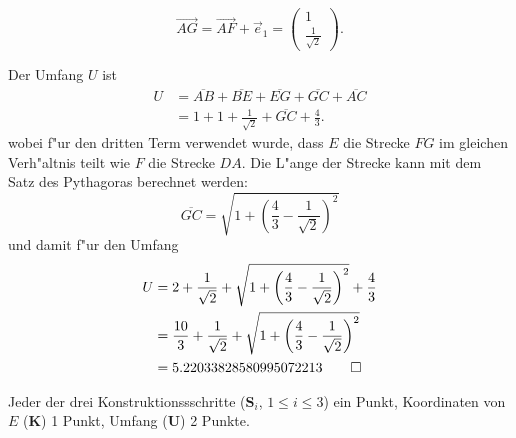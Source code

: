 \begin{loesung}
\begin{teilaufgaben}
\begin{enumerate}
\[
\overrightarrow{AG}
=
\overrightarrow{AF}+\vec{e}_1
=
\begin{pmatrix}1\\\frac1{\sqrt{2}}\end{pmatrix}.
\]
\end{enumerate}
\item
Der Umfang $U$ ist
\begin{align*}
U
&=
\overline{AB} + \overline{BE} + \overline{EG} + \overline{GC} +\overline{AC}
\\
&=
1 + 1 + \frac1{\sqrt{2}}+\overline{GC} + \frac43.
\end{align*}
wobei f"ur den dritten Term verwendet wurde, dass $E$ die Strecke
$FG$ im gleichen Verh"altnis teilt wie $F$ die Strecke $DA$.
Die L"ange der Strecke kann mit dem Satz des Pythagoras berechnet
werden:
\[
\overline{GC}
=
\sqrt{1+\left(\frac43-\frac1{\sqrt{2}}\right)^2}
\]
und damit f"ur den Umfang
\begin{align*}
U
&=
 2
+ \frac1{\sqrt{2}}
+ \sqrt{1+\left(\frac43-\frac1{\sqrt{2}}\right)^2}
+ \frac43
\\
&=
\frac{10}{3}
+ \frac1{\sqrt{2}}
+ \sqrt{1+\left(\frac43-\frac1{\sqrt{2}}\right)^2}
\\
&=
5.22033828580995072213
\qedhere
\end{align*}
\end{teilaufgaben}
\end{loesung}

\begin{bewertung}
Jeder der drei Konstruktionssschritte ($\textbf{S}_i$, $1\le i\le 3$) ein Punkt,
Koordinaten von $E$ ({\bf K}) 1 Punkt,
Umfang ({\bf U}) 2 Punkte.
\end{bewertung}


